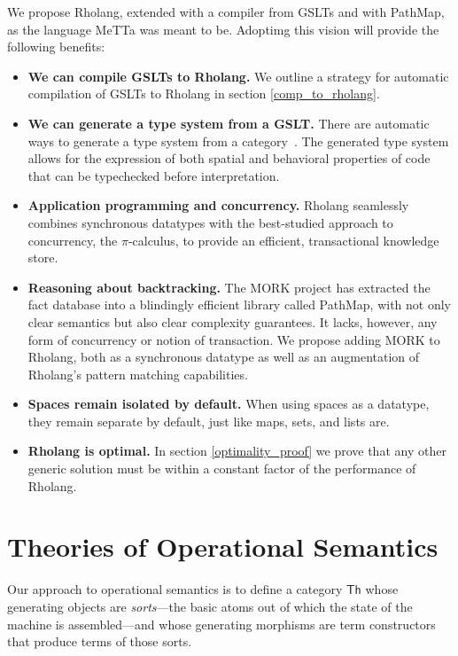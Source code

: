 \documentclass{article}
\begin{document}
We propose Rholang, extended with a compiler from GSLTs and with PathMap, as the language MeTTa was meant to be.  Adoptimg this vision will provide the following benefits:

\begin{itemize}
    \item {\bf We can compile GSLTs to Rholang.} We outline a strategy for automatic compilation of GSLTs to Rholang in section \ref{comp_to_rholang}.
    \item {\bf We can generate a type system from a GSLT.} There are automatic ways to generate a type system from a category~\cite{WilliamsStay2021}. The generated type system allows for the expression of both spatial and behavioral properties of code that can be typechecked before interpretation.
    \item {\bf Application programming and concurrency.} Rholang seamlessly combines synchronous datatypes with the best-studied approach to concurrency, the $\pi$-calculus, to provide an efficient, transactional knowledge store.
    \item {\bf Reasoning about backtracking.} The MORK project has extracted the fact database into a blindingly efficient library called PathMap, with not only clear semantics but also clear complexity guarantees.  It lacks, however, any form of concurrency or notion of transaction.  We propose adding MORK to Rholang, both as a synchronous datatype as well as an augmentation of Rholang's pattern matching capabilities.
    \item {\bf Spaces remain isolated by default.} When using spaces as a datatype, they remain separate by default, just like maps, sets, and lists are.
    \item {\bf Rholang is optimal.}  In section \ref{optimality_proof} we prove that any other generic solution must be within a constant factor of the performance of Rholang.
\end{itemize}

\section{Theories of Operational Semantics}

Our approach to operational semantics is to define a category $\mathsf{Th}$ whose generating objects are \emph{sorts}---the basic atoms out of which the state of the machine is assembled---and whose generating morphisms are term constructors that produce terms of those sorts.
\end{document}
